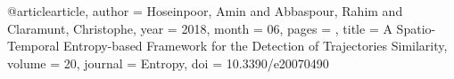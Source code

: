 @article{article,
author = {Hoseinpoor, Amin and Abbaspour, Rahim and Claramunt, Christophe},
year = {2018},
month = {06},
pages = {},
title = {A Spatio-Temporal Entropy-based Framework for the Detection of Trajectories Similarity},
volume = {20},
journal = {Entropy},
doi = {10.3390/e20070490}
}